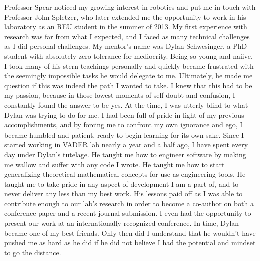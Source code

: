 \documentclass[12pt]{article}
\begin{document}
Professor Spear noticed my growing interest in robotics and put me in touch
with Professor John Spletzer, who later extended me the opportunity to work in
his laboratory as an REU student in the summer of 2013. My first experience
with research was far from what I expected, and I faced as many technical
challenges as I did personal challenges.  My mentor's name was Dylan
Schwesinger, a PhD student with absolutely zero tolerance for mediocrity.
Being so young and naiive, I took many of his stern teachings personally and
quickly became frustrated with the seemingly impossible tasks he would delegate
to me. Ultimately, he made me question if this was indeed the path I wanted to
take.  I knew that this had to be my passion, because in those lowest moments
of self-doubt and confusion, I constantly found the answer to be yes. At the
time, I was utterly blind to what Dylan was trying to do for me. I had been
full of pride in light of my previous accomplishments, and by forcing me to
confront my own ignorance and ego, I became humbled and patient, ready to begin
learning for its own sake. Since I started working in VADER lab nearly a year
and a half ago, I have spent every day under Dylan's tutelage.  He taught me
how to engineer software by making me wallow and suffer with any code I wrote.
He taught me how to start generalizing theoretical mathematical concepts for
use as engineering tools. He taught me to take pride in any aspect of
development I am a part of, and to never deliver any less than my best work.
His lessons paid off as I was able to contribute enough to our lab's research
in order to become a co-author on both a conference paper and a recent
journal submission. I even had the opportunity to present our work at an
internationally recognized conference. In time, Dylan became one of my best
friends. Only then did I understand that he wouldn't have pushed me as hard as
he did if he did not believe I had the potential and mindset to go the
distance.
\end{document}
